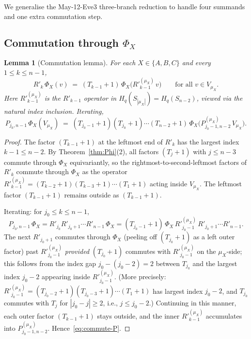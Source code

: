 \documentclass[11pt]{article}
\newtheorem{lemma}[theorem]{Lemma}
\theoremstyle{definition}
\begin{document}
We generalise the May-12-Eve3 three-branch reduction to handle four
summands and one extra commutation step.

\subsection{Commutation through $\Phi_X$}

\begin{lemma}[Commutation lemma]\label{lem:commute}
For each $X \in \{A, B, C\}$ and every $1 \le k \le n - 1$,
\[
   R'_k\, \Phi_X(v) \;=\; (T_{k-1}{+}1)\, \Phi_X\!\big(R'^{(\mu_X)}_{k-1}\, v\big)
   \qquad \text{for all } v \in V_{\mu_X}.
\]
Here $R'^{(\mu_X)}_{k-1}$ is the $R'_{k-1}$ operator in
$H_q(S_{|\mu_X|}) = H_q(S_{n-2})$, viewed via the natural index
inclusion. Iterating,
\begin{equation}\label{eq:commute-P}
   P_{j_0, n-1}\, \Phi_X(V_{\mu_X})
   \;=\; (T_{j_0 - 1}{+}1)(T_{j_0}{+}1)\cdots(T_{n-2}{+}1)
       \, \Phi_X\!\big(P^{(\mu_X)}_{j_0 - 1, n - 2}\, V_{\mu_X}\big).
\end{equation}
\end{lemma}

\begin{proof}
The factor $(T_{k-1}+1)$ at the leftmost end of $R'_k$ has the largest
index $k - 1 \le n - 2$. By Theorem~\ref{thm:Phi}(2), all factors
$(T_j{+}1)$ with $j \le n - 3$ commute through $\Phi_X$ equivariantly,
so the rightmost-to-second-leftmost factors of $R'_k$ commute through
$\Phi_X$ as the operator $R'^{(\mu_X)}_{k-1} = (T_{k-2}{+}1)(T_{k-3}{+}1)
\cdots (T_1{+}1)$ acting inside $V_{\mu_X}$. The leftmost factor
$(T_{k-1}{+}1)$ remains outside as $(T_{k-1}{+}1)$.

Iterating: for $j_0 \le k \le n - 1$,
\[
   P_{j_0, n-1}\, \Phi_X
   = R'_{j_0} R'_{j_0+1} \cdots R'_{n-1}\, \Phi_X
   = (T_{j_0-1}{+}1)\, \Phi_X\, R'^{(\mu_X)}_{j_0-1}
       \, R'_{j_0+1} \cdots R'_{n-1}.
\]
The next $R'_{j_0+1}$ commutes through $\Phi_X$ (peeling off
$(T_{j_0}{+}1)$ as a left outer factor) past $R'^{(\mu_X)}_{j_0-1}$
\emph{provided} $(T_{j_0}{+}1)$ commutes with $R'^{(\mu_X)}_{j_0-1}$
on the $\mu_X$-side; this follows from the index gap
$j_0 - (j_0 - 2) = 2$ between $T_{j_0}$ and the largest index $j_0 - 2$
appearing inside $R'^{(\mu_X)}_{j_0-1}$. (More precisely:
$R'^{(\mu_X)}_{j_0-1} = (T_{j_0-2}{+}1)(T_{j_0-3}{+}1)\cdots(T_1{+}1)$
has largest index $j_0 - 2$, and $T_{j_0}$ commutes with $T_j$ for
$|j_0 - j| \ge 2$, i.e., $j \le j_0 - 2$.) Continuing in this manner,
each outer factor $(T_{k-1}{+}1)$ stays outside, and the inner
$R'^{(\mu_X)}_{k-1}$ accumulates into $P^{(\mu_X)}_{j_0-1, n-2}$.
Hence~\eqref{eq:commute-P}.
\end{proof}
\end{document}
